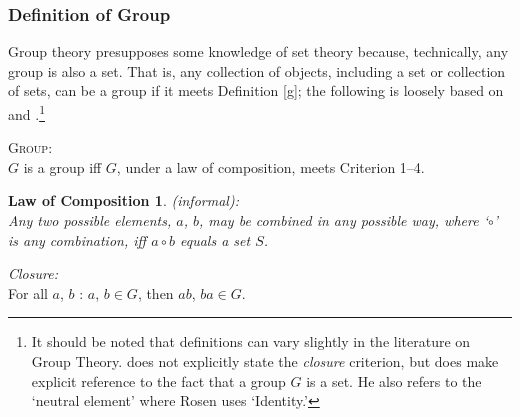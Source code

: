 \documentclass[11pt]{article}
\begin{document}

\subsubsection{Definition of Group}
Group theory presupposes some knowledge of set theory because, technically, any group is also a set. That is, any collection of objects, including a set or collection of sets, can be a group if it meets Definition \ref{g}; the following is loosely based on \cite{rosen:1995} and \cite{milne:2008}.\footnote{It should be noted that definitions can vary slightly in the literature on Group Theory. \cite{milne:2008} does not explicitly state the \textsl{closure} criterion, but does make explicit reference to the fact that a group $G$ is a set. He also refers to the `neutral element' where Rosen uses `Identity.'}

\begin{definition}
\textsc{Group:}\\
$G$ is a group iff $G$, under a law of composition, meets Criterion 1--4.\label{g} 
\end{definition}

\newtheorem*{comp}{Law of Composition}
\begin{comp}
\textsc(informal):\\
Any two possible elements, $a$, $b$, may be combined in any possible way, where `$\circ$' is any combination, iff $a \circ b$ equals a set $S$.
\end{comp}

\begin{criterion}
\textsl{Closure:}\\ For all $a$, $b$ : $a$, $b \in G$, then $ab$, $ba \in G$.
\end{criterion}
\end{document}

